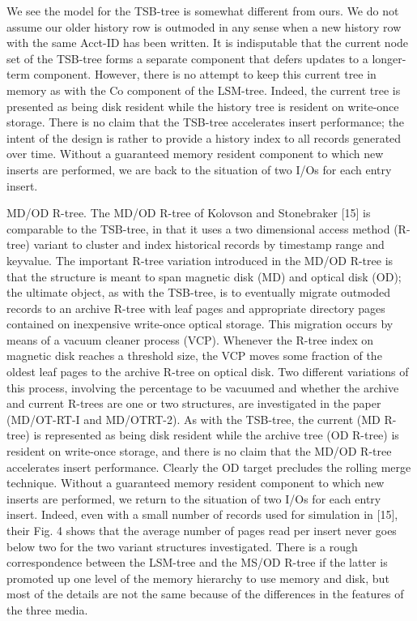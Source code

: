 \documentclass[a4paper,11pt,notitlepage,twoside,openright]{article}
\begin{document}
We see the model for the TSB-tree is somewhat different from ours. We do
not assume our older history row is outmoded in any sense when a new
history row with the same Acct-ID has been written. It is indisputable
that the current node set of the TSB-tree forms a separate component
that defers updates to a longer-term component. However, there is no
attempt to keep this current tree in memory as with the Co component of
the LSM-tree. Indeed, the current tree is presented as being disk
resident while the history tree is resident on write-once storage. There
is no claim that the TSB-tree accelerates insert performance; the intent
of the design is rather to provide a history index to all records
generated over time. Without a guaranteed memory resident component to
which new inserts are performed, we are back to the situation of two
I/Os for each entry insert.

MD/OD R-tree. The MD/OD R-tree of Kolovson and Stonebraker {[}15{]} is
comparable to the TSB-tree, in that it uses a two dimensional access
method (R-tree) variant to cluster and index historical records by
timestamp range and keyvalue. The important R-tree variation introduced
in the MD/OD R-tree is that the structure is meant to span magnetic disk
(MD) and optical disk (OD); the ultimate object, as with the TSB-tree,
is to eventually migrate outmoded records to an archive R-tree with leaf
pages and appropriate directory pages contained on inexpensive
write-once optical storage. This migration occurs by means of a vacuum
cleaner process (VCP). Whenever the R-tree index on magnetic disk
reaches a threshold size, the VCP moves some fraction of the oldest leaf
pages to the archive R-tree on optical disk. Two different variations of
this process, involving the percentage to be vacuumed and whether the
archive and current R-trees are one or two structures, are investigated
in the paper (MD/OT-RT-I and MD/OTRT-2). As with the TSB-tree, the
current (MD R-tree) is represented as being disk resident while the
archive tree (OD R-tree) is resident on write-once storage, and there is
no claim that the MD/OD R-tree accelerates insert performance. Clearly
the OD target precludes the rolling merge technique. Without a
guaranteed memory resident component to which new inserts are performed,
we return to the situation of two I/Os for each entry insert. Indeed,
even with a small number of records used for simulation in {[}15{]},
their Fig. 4 shows that the average number of pages read per insert
never goes below two for the two variant structures investigated. There
is a rough correspondence between the LSM-tree and the MS/OD R-tree if
the latter is promoted up one level of the memory hierarchy to use
memory and disk, but most of the details are not the same because of the
differences in the features of the three media.
\end{document}
